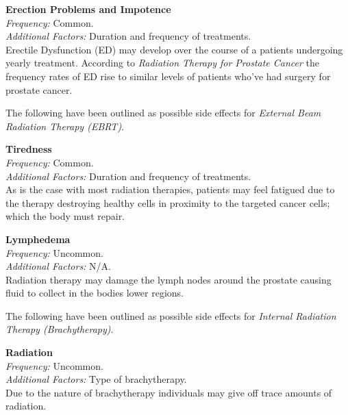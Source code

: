 \documentclass[journal]{vgtc}                %
\begin{document}
                        \textbf{Erection Problems and Impotence}
                        \\ \textit{Frequency:} Common.
                        \\ \textit{Additional Factors:} Duration and frequency of treatments.
                        \\ Erectile Dysfunction (ED) may develop over the course of a patients undergoing yearly treatment. According to \textit{Radiation Therapy for Prostate Cancer} the frequency rates of ED rise to similar levels of patients who've had surgery for prostate cancer. \cite{RadiationTherapy:2005}
                        \newline

                        The following have been outlined as possible side effects for \textit{External Beam Radiation Therapy (EBRT)}.
                        \newline

                        \textbf{Tiredness}
                        \\ \textit{Frequency:} Common.
                        \\ \textit{Additional Factors:} Duration and frequency of treatments.
                        \\ As is the case with most radiation therapies, patients may feel fatigued due to the therapy destroying healthy cells in proximity to the targeted cancer cells; which the body must repair. \cite{RadiationTherapy:2005}
                        \newline

                        \textbf{Lymphedema}
                        \\ \textit{Frequency:} Uncommon.
                        \\ \textit{Additional Factors:} N/A.
                        \\ Radiation therapy may damage the lymph nodes around the prostate causing fluid to collect in the bodies lower regions. \cite{RadiationTherapy:2005}
                        \newline

                        The following have been outlined as possible side effects for \textit{Internal Radiation Therapy (Brachytherapy)}.
                        \newline

                        \textbf{Radiation}
                        \\ \textit{Frequency:} Uncommon.
                        \\ \textit{Additional Factors:} Type of brachytherapy.
                        \\ Due to the nature of brachytherapy individuals may give off trace amounts of radiation. \cite{RadiationTherapy:2005}
                        \newline
\end{document}
